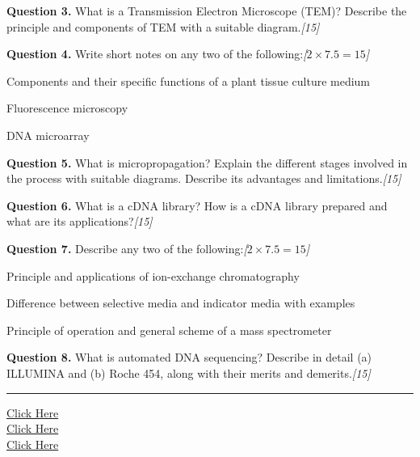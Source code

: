 \documentclass[11pt,a4paper]{article}
\newcommand{\pts}[1]{\hfill   \textit{[#1]}}
\begin{document}
\medskip


\noindent   \textbf{Question 3.} What is a Transmission Electron Microscope (TEM)? Describe the principle and components of TEM with a suitable diagram.\pts{15}

\medskip


\noindent   \textbf{Question 4.} Write short notes on any two of the following:\pts{$2  \times 7.5 = 15$}

\begin{parts}
  \item Components and their specific functions of a plant tissue culture medium
  \item Fluorescence microscopy
  \item DNA microarray
\end{parts}

\medskip


\noindent   \textbf{Question 5.} What is micropropagation? Explain the different stages involved in the process with suitable diagrams. Describe its advantages and limitations.\pts{15}

\medskip


\noindent   \textbf{Question 6.} What is a cDNA library? How is a cDNA library prepared and what are its applications?\pts{15}

\medskip


\noindent   \textbf{Question 7.} Describe any two of the following:\pts{$2  \times 7.5 = 15$}

\begin{parts}
  \item Principle and applications of ion-exchange chromatography
  \item Difference between selective media and indicator media with examples
  \item Principle of operation and general scheme of a mass spectrometer
\end{parts}

\medskip


\noindent   \textbf{Question 8.} What is automated DNA sequencing? Describe in detail (a) ILLUMINA and (b) Roche 454, along with their merits and demerits.\pts{15}

\vfill
\rule{\linewidth}{0.4pt}

\begin{center}\small
\href{https://bhu-exam.vercel.app/}{Click Here}\\[4pt]\href{https://me-aryan.vercel.app/}{Click Here}\\[4pt]\href{https://quashan-me.vercel.app/}{Click Here}
\end{center}
\end{document}
